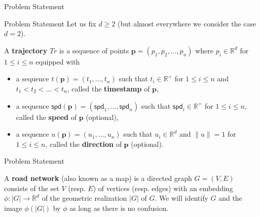 \documentclass[aspectratio=169, bigfiles]{beamer}
\newcommand{\R}{\mathbb{R}}
\newcommand{\spd}{\mathsf{spd}}
\begin{document}
\begin{frame}{Problem Statement}
\begin{center}
\end{center}
\end{frame}



\begin{frame}{Problem Statement}
Let us fix $d \geq 2$ (but almost everywhere we consider the case $d = 2$).
\begin{definition}[Trajectory] \label{Tr}
A \textbf{trajectory} $Tr$ is a sequence of points $\mathbf{p} = (p_1,p_2,\dots, p_n)$ where $p_i\in \R^d$ for $1\leq i\leq n$ equipped with 
\begin{itemize}
    \item a sequence $t(\mathbf{p}) = (t_1,\dots,t_{n})$ such that $t_i\in \R^{+}$ for $1\leq i\leq n$ and  $t_1<t_2<\dots <t_n$, called the \textbf{timestamp} of $\mathbf{p}$,
    \item a sequence ${\spd}(\mathbf{p}) = ({\spd}_1,\dots,{\spd}_{n})$ such that $\spd_i\in \R^{+}$ for $1\leq i\leq n$, called the \textbf{speed} of $\mathbf{p}$ (optional),
    \item a sequence $u(\mathbf{p}) = (u_1, \dots, u_n)$ such that $u_i\in \R^d$ and $\|u\|=1$ for $1\leq i\leq n$, called the \textbf{direction} of $\mathbf{p}$ (optional).
\end{itemize}
\end{definition}
\end{frame}



\begin{frame}{Problem Statement}
\begin{definition} \label{RN}
A  \textbf{road network} (also known as a map) is a directed graph $G=(V,E)$ consists of the set $V$ (resp. $E$) of vertices (resp. edges) with an embedding $\phi:|G|\rightarrow\mathbb{R}^{d}$ of the geometric realization $|G|$ of $G$.
We will identify $G$ and the image $\phi(|G|)$ by $\phi$ as long as there is no confusion.
\end{definition}
\end{frame}
\end{document}
